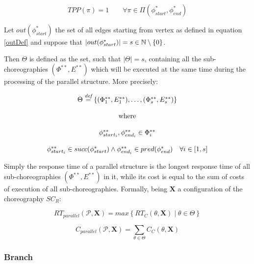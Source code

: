 \begin{equation}
	TPP(\pi) = 1 \qquad \forall \pi \in \Pi(\phi_{start}^*, \phi_{end}^*)
\end{equation}

Let $out(\phi_{start}^*)$ the set of all edges starting from vertex as defined in equation \ref{outDef} and suppose that $|out(\phi_{start}^*)| = s \in \mathbb{N} \setminus \left\lbrace 0 \right\rbrace $.

Then $\Theta$ is defined as the set, such that $|\Theta| = s$, containing all the sub-choreographies $(\Phi^{**}, E^{**})$ which will be executed at the same time during the processing of the parallel structure. More precisely:

\begin{equation}
	\begin{array}{c}
	\Theta \overset{\textit{def}}{=} \left\lbrace (\Phi^{**}_1, E^{**}_1), \ldots ,(\Phi^{**}_s, E^{**}_s) \right\rbrace \\\\
	\text{ where } \\\\
	\phi_{start_{i}}^{**}, \phi_{end_{i}}^{**} \in \Phi^{**}_i \\\\
	
	\phi_{start_{i}}^{**} \in succ(\phi_{start}^*) \wedge \phi_{end_{i}}^{**} \in pred (\phi_{end}^*) \quad \forall i \in \left[ 1, s \right]
	\end{array}
\end{equation} 

Simply the response time of a parallel structure is the longest response time of all
sub-choreographies $(\Phi^{**}, E^{**})$ in it, while its cost is equal to the sum of costs of execution of all sub-choreographies. Formally, being $\textbf{X}$ a configuration of the choreography $SC_R$:

\begin{equation}
	RT_{parallel}(\mathcal{P}, \textbf{X}) = max \left\lbrace RT_C(\mathcal{\theta}, \textbf{X}) \mid \theta \in \Theta \right\rbrace 
\end{equation}

\begin{equation}
	C_{parallel}(\mathcal{P}, \textbf{X}) = \sum_{\theta \in \Theta} C_C(\theta, \textbf{X})
\end{equation}

\subsubsection{Branch}

